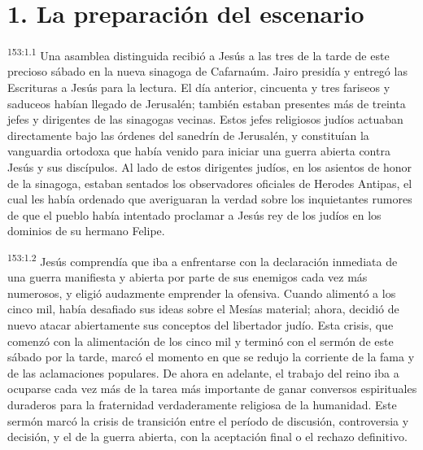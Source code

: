 \section*{1. La preparación del escenario}
\par
\textsuperscript{153:1.1} Una asamblea distinguida recibió a Jesús a las tres de la tarde de este precioso sábado en la nueva sinagoga de Cafarnaúm. Jairo presidía y entregó las Escrituras a Jesús para la lectura. El día anterior, cincuenta y tres fariseos y saduceos habían llegado de Jerusalén; también estaban presentes más de treinta jefes y dirigentes de las sinagogas vecinas. Estos jefes religiosos judíos actuaban directamente bajo las órdenes del sanedrín de Jerusalén, y constituían la vanguardia ortodoxa que había venido para iniciar una guerra abierta contra Jesús y sus discípulos. Al lado de estos dirigentes judíos, en los asientos de honor de la sinagoga, estaban sentados los observadores oficiales de Herodes Antipas, el cual les había ordenado que averiguaran la verdad sobre los inquietantes rumores de que el pueblo había intentado proclamar a Jesús rey de los judíos en los dominios de su hermano Felipe.

\par
\textsuperscript{153:1.2} Jesús comprendía que iba a enfrentarse con la declaración inmediata de una guerra manifiesta y abierta por parte de sus enemigos cada vez más numerosos, y eligió audazmente emprender la ofensiva. Cuando alimentó a los cinco mil, había desafiado sus ideas sobre el Mesías material; ahora, decidió de nuevo atacar abiertamente sus conceptos del libertador judío. Esta crisis, que comenzó con la alimentación de los cinco mil y terminó con el sermón de este sábado por la tarde, marcó el momento en que se redujo la corriente de la fama y de las aclamaciones populares. De ahora en adelante, el trabajo del reino iba a ocuparse cada vez más de la tarea más importante de ganar conversos espirituales duraderos para la fraternidad verdaderamente religiosa de la humanidad. Este sermón marcó la crisis de transición entre el período de discusión, controversia y decisión, y el de la guerra abierta, con la aceptación final o el rechazo definitivo.

